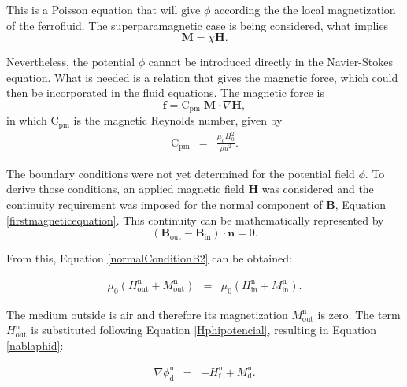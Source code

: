 \documentclass[journal]{IEEEtran}
\begin{document}
This is a Poisson equation that will give $\phi$ according the the local magnetization of the ferrofluid. The superparamagnetic case is being considered, what implies 
\begin{equation}\mathbf{M} = \chi \mathbf{H}.\end{equation}


Nevertheless, the potential $\phi$ cannot be introduced directly in the Navier-Stokes equation. What is needed is a relation that gives the magnetic force, which could then be incorporated in the fluid equations. The magnetic force is \begin{equation}
	\mathbf{f} = \mathrm{C}_{\mathrm{pm}}\; \mathbf{M}\cdot \nabla \mathbf{H},\label{magneticforce}\end{equation} in which $\mathrm{C}_{\mathrm{pm}}$ is the magnetic Reynolds number, given by 
\begin{eqnarray}
\mathrm{C}_{\mathrm{pm}} & = & \frac{\mu_0 H_0^2}{\rho u^2}.\label{cpm}
\end{eqnarray}

The boundary conditions were not yet determined for the potential field $\phi$. To derive those conditions, an applied magnetic field $\mathbf{H}$ was considered and the continuity requirement was imposed for the normal component of $\mathbf{B}$, Equation \ref{firstmagneticequation}. This continuity can be mathematically represented by \begin{equation}\left(\mathbf{B}_{\mathrm{out}} - \mathbf{B}_{\mathrm{in}}\right)\cdot \mathbf{n} = 0 \label{normalconditionB}.\end{equation} 

From this, Equation \ref{normalConditionB2} can be obtained:

\begin{eqnarray}
\mu_0 (H_{\mathrm{out}}^{\mathrm{n}} + M_{\mathrm{out}}^{\mathrm{n}}) &=&  \mu_0(H_{\mathrm{in}}^{\mathrm{n}}+M_{\mathrm{in}}^{\mathrm{n}}).\label{normalConditionB2}
\end{eqnarray}

The medium outside is air and therefore its magnetization $M_{\mathrm{out}}^{\mathrm{n}}$ is zero. The term $H_{\mathrm{out}}^{\mathrm{n}}$ is substituted following  Equation \ref{Hphipotencial}, resulting  in Equation \ref{nablaphid}:

\begin{eqnarray}
\nabla\phi_{\mathrm{d}}^{\mathrm{n}} & = & -H_{\mathrm{f}}^{\mathrm{n}} + M_{\mathrm{d}}^{\mathrm{n}}. \label{nablaphid}
\end{eqnarray}
\end{document}
